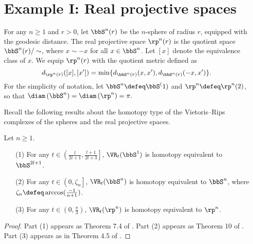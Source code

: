 
\section{Example I: Real projective spaces}\label{s:continuous}



For any $n\geq 1$ and $r>0$, let $\bbS^n(r)$ be the $n$-sphere of radius $r$, equipped with the geodesic distance. 
The real projective space $\rp^n(r)$ is the quotient space $\bbS^n(r)/\sim$, where $x\sim -x$ for all $x\in \bbS^n $. Let $[x]$ denote the equivalence class of $x$. We equip $\rp^n(r)$ with the quotient metric defined as
\[d_{\rp^n(r)}([x],[x'])=\min \{d_{\bbS^n(r)}(x,x'),d_{\bbS^n(r)}(-x,x')\}.\]
For the simplicity of notation, let $\bbS^n\defeq\bbS^(1)$ and $\rp^n\defeq\rp^n(2)$, so that $\diam\left(\bbS^n \right)=\diam\left(\rp^n \right)=\pi.$

Recall the following results about the homotopy type of the Vietoris--Rips complexes of the spheres and the real projective spaces. 
\begin{proposition}\label{prop:homotopy type} 
Let $n\geq 1$.
\begin{itemize}
    \item[(1)]\label{prop:S1} For any $ t\in \left(\frac{l}{2l+1},\frac{l+1}{2l+3}\right]$, $\VR_t(\bbS^1)$ is homotopy equivalent to $\bbS^{2l+1}$. 
    \item[(2)]\label{prop:Sn} For any $ t\in \left(0,\zeta_n\right]$, $\VR_t(\bbS^n)$ is homotopy equivalent to $\bbS^n$, where $\zeta_n\defeq\arccos(\frac{-1}{n+1})$. 
    \item[(3)]\label{prop:RPn} For any $ t\in \left(0,\frac{\pi}{3} \right)$, $\VR_t(\rp^n)$ is homotopy equivalent to $\rp^n$.
\end{itemize}
\end{proposition}

\begin{proof}
Part (1) appears as Theorem 7.4 of \cite{adamaszek2017vietoris}. Part (2) appears as Theorem 10 of \cite{lim2020vietoris}. Part (3) appears as in Theorem 4.5 of \cite{adams2022metric}.
\end{proof}


